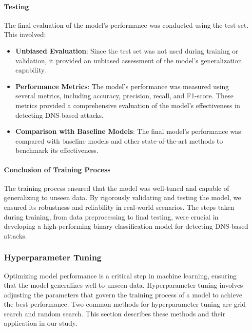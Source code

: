 \paragraph{Testing}

The final evaluation of the model's performance was conducted using the test set. This involved:

\begin{itemize}
    \item \textbf{Unbiased Evaluation}: Since the test set was not used during training or validation, it provided an unbiased assessment of the model’s generalization capability.
    \item \textbf{Performance Metrics}: The model's performance was measured using several metrics, including accuracy, precision, recall, and F1-score. These metrics provided a comprehensive evaluation of the model's effectiveness in detecting DNS-based attacks.
    \item \textbf{Comparison with Baseline Models}: The final model's performance was compared with baseline models and other state-of-the-art methods to benchmark its effectiveness.
\end{itemize}

\paragraph{Conclusion of Training Process}

The training process ensured that the model was well-tuned and capable of generalizing to unseen data. By rigorously validating and testing the model, we ensured its robustness and reliability in real-world scenarios. The steps taken during training, from data preprocessing to final testing, were crucial in developing a high-performing binary classification model for detecting DNS-based attacks.


\subsubsection{Hyperparameter Tuning}

Optimizing model performance is a critical step in machine learning, ensuring that the model generalizes well to unseen data. Hyperparameter tuning involves adjusting the parameters that govern the training process of a model to achieve the best performance. Two common methods for hyperparameter tuning are grid search and random search. This section describes these methods and their application in our study.

